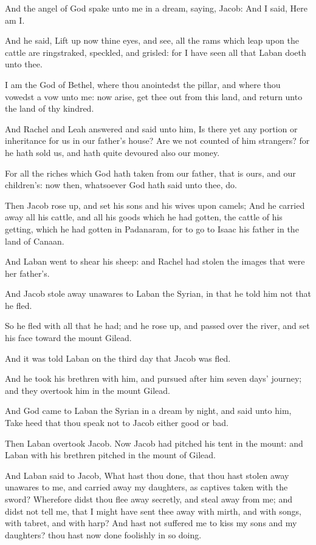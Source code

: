 \verse And the angel of God spake unto me in a dream, saying, Jacob:
And I said, Here am I.

\verse And he said, Lift up now thine eyes, and see, all the rams which
leap upon the cattle are ringstraked, speckled, and grisled: for I
have seen all that Laban doeth unto thee.

\verse I am the God of Bethel, where thou anointedst the pillar, and
where thou vowedst a vow unto me: now arise, get thee out from this
land, and return unto the land of thy kindred.

\verse And Rachel and Leah answered and said unto him, Is there yet any
portion or inheritance for us in our father's house?  \verse Are we not
counted of him strangers? for he hath sold us, and hath quite devoured
also our money.

\verse For all the riches which God hath taken from our father, that is
ours, and our children's: now then, whatsoever God hath said unto
thee, do.

\verse Then Jacob rose up, and set his sons and his wives upon camels;
\verse And he carried away all his cattle, and all his goods which he
had gotten, the cattle of his getting, which he had gotten in
Padanaram, for to go to Isaac his father in the land of Canaan.

\verse And Laban went to shear his sheep: and Rachel had stolen the
images that were her father's.

\verse And Jacob stole away unawares to Laban the Syrian, in that he
told him not that he fled.

\verse So he fled with all that he had; and he rose up, and passed over
the river, and set his face toward the mount Gilead.

\verse And it was told Laban on the third day that Jacob was fled.

\verse And he took his brethren with him, and pursued after him seven
days' journey; and they overtook him in the mount Gilead.

\verse And God came to Laban the Syrian in a dream by night, and said
unto him, Take heed that thou speak not to Jacob either good or bad.

\verse Then Laban overtook Jacob. Now Jacob had pitched his tent in the
mount: and Laban with his brethren pitched in the mount of Gilead.

\verse And Laban said to Jacob, What hast thou done, that thou hast
stolen away unawares to me, and carried away my daughters, as captives
taken with the sword?  \verse Wherefore didst thou flee away secretly,
and steal away from me; and didst not tell me, that I might have sent
thee away with mirth, and with songs, with tabret, and with harp?
\verse And hast not suffered me to kiss my sons and my daughters? thou
hast now done foolishly in so doing.

